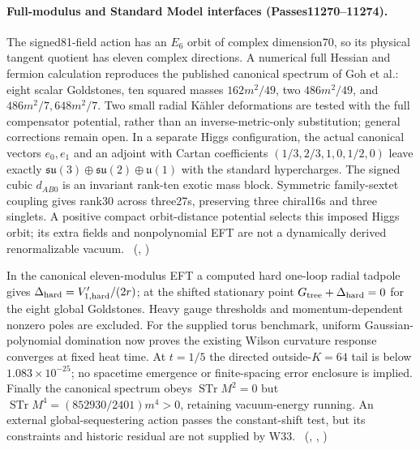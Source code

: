 \paragraph{Full-modulus and Standard Model interfaces (Passes11270--11274).}
The signed81-field action has an $E_6$ orbit of complex dimension70, so its
physical tangent quotient has eleven complex directions. A numerical full
Hessian and fermion calculation reproduces the published canonical spectrum
of Goh et al.: eight scalar Goldstones, ten squared masses $162m^2/49$,
two $486m^2/49$, and $486m^2/7,648m^2/7$. Two small radial
K\"ahler deformations are tested with the full compensator potential, rather
than an inverse-metric-only substitution; general corrections remain open.
In a separate Higgs configuration, the actual canonical vectors $e_0,e_1$
and an adjoint with Cartan coefficients $(1/3,2/3,1,0,1/2,0)$ leave exactly
$\mathfrak{su}(3)\oplus\mathfrak{su}(2)\oplus\mathfrak u(1)$ with the
standard hypercharges. The signed cubic $d_{AB0}$ is an invariant rank-ten
exotic mass block. Symmetric family-sextet coupling gives rank30 across
three27s, preserving three chiral16s and three singlets. A positive compact
orbit-distance potential selects this imposed Higgs orbit; its extra fields
and nonpolynomial EFT are not a dynamically derived renormalizable vacuum.
\tierC\ (,
)

In the canonical eleven-modulus EFT a computed hard one-loop radial tadpole
gives $\Delta_{\rm hard}=V'_{1,\rm hard}/(2r)$; at the shifted stationary
point $G_{\rm tree}+\Delta_{\rm hard}=0$ for the eight global Goldstones.
Heavy gauge thresholds and momentum-dependent nonzero poles are excluded.
For the supplied torus benchmark, uniform Gaussian-polynomial domination
now proves the existing Wilson curvature response converges at fixed heat
time. At $t=1/5$ the directed outside-$K=64$ tail is below
$1.083\times10^{-25}$; no spacetime emergence or finite-spacing error
enclosure is implied. Finally the canonical spectrum obeys
$\operatorname{STr}M^2=0$ but
$\operatorname{STr}M^4=(852930/2401)m^4>0$, retaining vacuum-energy
running. An external global-sequestering action passes the constant-shift
test, but its constraints and historic residual are not supplied by W33.
\tierC\ (,
,
)

